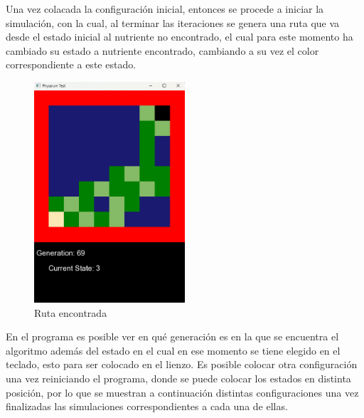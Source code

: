     \vskip 0.5cm
    Una vez colacada la configuraci\'on inicial, entonces se
        procede a iniciar la simulaci\'on, con la cual, al terminar las
        iteraciones se genera una ruta que va desde el estado inicial
        al nutriente no encontrado, el cual para este momento ha
        cambiado su estado a nutriente encontrado, cambiando a su
        vez el color correspondiente a este estado.
    \vskip 0.5cm
    \begin{figure}[htbp]
        \centering
        \includegraphics[width=0.5\textwidth]{./images/Pruebas/simulador/image003.png}
        \caption{Ruta encontrada}
        \label{fig:Ruta encontrada}
    \end{figure}
    \vskip 0.5cm
    En el programa es posible ver en qu\'e generaci\'on es en la que
        se encuentra el algoritmo adem\'as del estado en el cual en ese
        momento se tiene elegido en el teclado, esto para ser
        colocado en el lienzo.
    \vskip 0.5cm
    Es posible colocar otra configuraci\'on una vez reiniciando el
        programa, donde se puede colocar los estados en distinta
        posici\'on, por lo que se muestran a continuaci\'on distintas
        configuraciones una vez finalizadas las simulaciones
        correspondientes a cada una de ellas.
    \vskip 0.5cm

